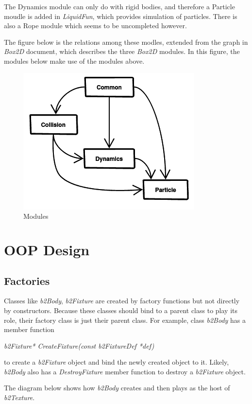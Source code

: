 \documentclass[UTF8]{ctexart}
\begin{document}
        The Dynamics module can only do with rigid bodies, and therefore a Particle moudle is added in \textit{LiquidFun}, which provides simulation of particles. There is also a Rope module which seems to be uncompleted however.

        The figure below is the relations among these modles, extended from the graph in \textit{Box2D} document, which describes the three \textit{Box2D} modules. In this figure, the modules below make use of the modules above.

        \begin{figure}[ht]
            \centering
            \includegraphics[width=.5\textwidth]{modules.png}
            \caption{Modules}
        \end{figure}

    \section{OOP Design}

        \subsection{Factories}

            Classes like \textit{b2Body}, \textit{b2Fixture} are created by factory functions but not directly by constructors. Because these classes should bind to a parent class to play its role, their factory class is just their parent class. For example, class \textit{b2Body} has a member function
            
            \textit{b2Fixture* CreateFixture(const b2FixtureDef *def)}

            \noindent to create a \textit{b2Fixture} object and bind the newly created object to it. Likely, \textit{b2Body} also has a \textit{DestroyFixture} member function to destroy a \textit{b2Fixture} object.

            The diagram below shows how \textit{b2Body} creates and then plays as the host of \textit{b2Texture}.
\end{document}
